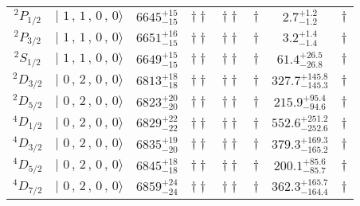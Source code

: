 \begin{tabular}{c| c c c c c c c}
$^{2}P_{1/2}$ & $\vert \,\,1\,,\,1\,,\,0\,,\,0 \rangle $ & $6645^{+15}_{-15}$ & $\dagger\dagger$ & $\dagger\dagger$ & $\dagger$ & $2.7^{+1.2}_{-1.2}$ & $\dagger$ \\ 
$^{2}P_{3/2}$ & $\vert \,\,1\,,\,1\,,\,0\,,\,0 \rangle $ & $6651^{+16}_{-15}$ & $\dagger\dagger$ & $\dagger\dagger$ & $\dagger$ & $3.2^{+1.4}_{-1.4}$ & $\dagger$ \\ 
$^{2}S_{1/2}$ & $\vert \,\,1\,,\,1\,,\,0\,,\,0 \rangle $ & $6649^{+15}_{-15}$ & $\dagger\dagger$ & $\dagger\dagger$ & $\dagger$ & $61.4^{+26.5}_{-26.8}$ & $\dagger$ \\ 
$^{2}D_{3/2}$ & $\vert \,\,0\,,\,2\,,\,0\,,\,0 \rangle $ & $6813^{+18}_{-18}$ & $\dagger\dagger$ & $\dagger\dagger$ & $\dagger$ & $327.7^{+145.8}_{-145.3}$ & $\dagger$ \\ 
$^{2}D_{5/2}$ & $\vert \,\,0\,,\,2\,,\,0\,,\,0 \rangle $ & $6823^{+20}_{-20}$ & $\dagger\dagger$ & $\dagger\dagger$ & $\dagger$ & $215.9^{+95.4}_{-94.6}$ & $\dagger$ \\ 
$^{4}D_{1/2}$ & $\vert \,\,0\,,\,2\,,\,0\,,\,0 \rangle $ & $6829^{+22}_{-22}$ & $\dagger\dagger$ & $\dagger\dagger$ & $\dagger$ & $552.6^{+251.2}_{-252.6}$ & $\dagger$ \\ 
$^{4}D_{3/2}$ & $\vert \,\,0\,,\,2\,,\,0\,,\,0 \rangle $ & $6835^{+19}_{-20}$ & $\dagger\dagger$ & $\dagger\dagger$ & $\dagger$ & $379.3^{+169.3}_{-165.2}$ & $\dagger$ \\ 
$^{4}D_{5/2}$ & $\vert \,\,0\,,\,2\,,\,0\,,\,0 \rangle $ & $6845^{+18}_{-18}$ & $\dagger\dagger$ & $\dagger\dagger$ & $\dagger$ & $200.1^{+85.6}_{-85.7}$ & $\dagger$ \\ 
$^{4}D_{7/2}$ & $\vert \,\,0\,,\,2\,,\,0\,,\,0 \rangle $ & $6859^{+24}_{-24}$ & $\dagger\dagger$ & $\dagger\dagger$ & $\dagger$ & $362.3^{+165.7}_{-164.4}$ & $\dagger$ \\ 
\hline \hline
\end{tabular}
